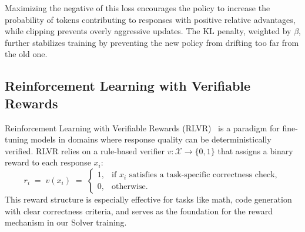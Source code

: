 Maximizing the negative of this loss encourages the policy to increase the probability of tokens contributing to responses with positive relative advantages, while clipping prevents overly aggressive updates. The KL penalty, weighted by $\beta$, further stabilizes training by preventing the new policy from drifting too far from the old one.


\subsection{Reinforcement Learning with Verifiable Rewards}
\label{sec:rlvr}

Reinforcement Learning with Verifiable Rewards (RLVR)~\citep{Lambert2024TLU3P} is a paradigm for fine-tuning models in domains where response quality can be deterministically verified. RLVR relies on a rule-based verifier $v : \mathcal{X} \to \{0,1\}$ that assigns a binary reward to each response $x_i$:
\[
  r_i \;=\; v(x_i)
  \;=\;
  \begin{cases}
    1, & \text{if } x_i \text{ satisfies a task-specific correctness check},\\[4pt]
    0, & \text{otherwise}.
  \end{cases}
\]
This reward structure is especially effective for tasks like math, code generation with clear correctness criteria, and serves as the foundation for the reward mechanism in our Solver training.